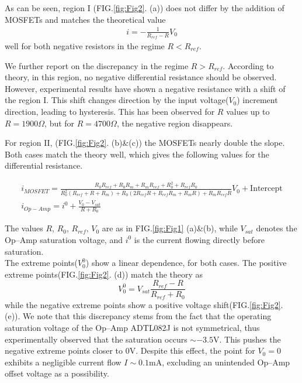 \documentclass[%
 aip,
amsmath,amssymb,
reprint,
]{revtex4-1}
\begin{document}
As can be seen, region I (FIG.\ref{fig:Fig2}. (a)) does not differ by the addition of MOSFETs and matches the theoretical value
\begin{eqnarray}
  i = -\frac{1}{R_{ref}-R}V_0
\end{eqnarray}
well for both negative resistors in the regime $R<R_{ref}$.

We further report on the discrepancy in the regime $R>R_{ref}$. According to theory, in this region, no negative differential resistance should be observed. However, experimental results have shown a negative resistance with a shift of the region I. This shift changes direction by the input voltage($V_0$) increment direction, leading to hysteresis. This has been observed for $R$ values up to $R=1900\Omega$, but for $R=4700\Omega$, the negative region disappears.

For region II, (FIG.\ref{fig:Fig2}. (b)\&(c)) the MOSFETs nearly double the slope. Both cases match the theory well, which gives the following values for the differential resistance.
\begin{widetext}
\begin{eqnarray}
  i_{MOSFET} = \frac{R_0R_{ref}+R_0R_m+R_mR_{ref}+R_0^2+R_{ref}R_0}{R_0^2(R_{ref}+R+R_m)+R_0(2R_{ref}R+R_{ref}R_m+R_mR)+R_mR_{ref}R}V_0 + \text{Intercept}\\
  i_{Op-Amp} = i^{ 0}+\frac{V_0-V_{sat}}{R+R_0}
\end{eqnarray}
\end{widetext}
The values $R,\,R_0,\,R_{ref},\,V_0$ are as in FIG.\ref{fig:Fig1} (a)\&(b), while $V_{sat}$ denotes the Op--Amp saturation voltage, and $i^0$ is the current flowing directly before saturation.\\

The extreme points($V_0^0$) show a linear dependence, for both cases. The positive extreme points(FIG.\ref{fig:Fig2}. (d)) match the theory as
\begin{equation}
    V_0^0 = V_{sat}\frac{R_{ref}-R}{R_{ref}+R_0}
\end{equation}
while the negative extreme points show a positive voltage shift(FIG.\ref{fig:Fig2}. (e)). We note that this discrepancy stems from the fact that the operating saturation voltage of the Op--Amp ADTL082J is not symmetrical, thus experimentally observed that the saturation occurs $\sim-3.5$V. This pushes the negative extreme points closer to $0$V. Despite this effect, the point for $V_0=0$ exhibits a negligible current flow $I\sim0.1$mA, excluding an unintended Op--Amp offset voltage as a possibility. \\
\end{document}
